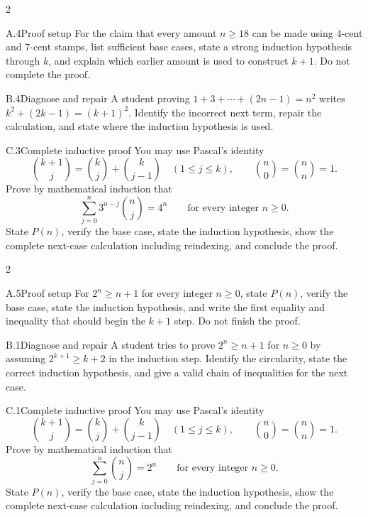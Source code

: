 \documentclass[9pt]{extarticle}
\begin{document}
\CoreWorkArea
\FormBreak
{}
\begin{multicols}{2}
\begin{CompactCoreProblem}{A.4}{Proof setup}
For the claim that every amount $n\ge18$ can be made using 4-cent and 7-cent stamps, list sufficient base cases, state a strong induction hypothesis through $k$, and explain which earlier amount is used to construct $k+1$. Do not complete the proof.
\end{CompactCoreProblem}
\begin{CompactCoreProblem}{B.4}{Diagnose and repair}
A student proving $1+3+\cdots+(2n-1)=n^2$ writes $k^2+(2k-1)=(k+1)^2$. Identify the incorrect next term, repair the calculation, and state where the induction hypothesis is used.
\end{CompactCoreProblem}
\end{multicols}
\begin{CompactCoreProblem}{C.3}{Complete inductive proof}
You may use Pascal's identity
\[
\binom{k+1}{j}=\binom{k}{j}+\binom{k}{j-1}
\quad(1\le j\le k),\qquad
\binom{n}{0}=\binom{n}{n}=1.
\]
Prove by mathematical induction that
\[
\sum_{j=0}^{n} 3^{n-j}\binom{n}{j}=4^n\qquad\text{for every integer }n\ge0.
\]
State $P(n)$, verify the base case, state the induction hypothesis, show the complete next-case calculation including reindexing, and conclude the proof.
\end{CompactCoreProblem}
\CoreWorkArea
\FormBreak
{}
\begin{multicols}{2}
\begin{CompactCoreProblem}{A.5}{Proof setup}
For $2^n\ge n+1$ for every integer $n\ge0$, state $P(n)$, verify the base case, state the induction hypothesis, and write the first equality and inequality that should begin the $k+1$ step. Do not finish the proof.
\end{CompactCoreProblem}
\begin{CompactCoreProblem}{B.1}{Diagnose and repair}
A student tries to prove $2^n\ge n+1$ for $n\ge0$ by assuming $2^{k+1}\ge k+2$ in the induction step. Identify the circularity, state the correct induction hypothesis, and give a valid chain of inequalities for the next case.
\end{CompactCoreProblem}
\end{multicols}
\begin{CompactCoreProblem}{C.1}{Complete inductive proof}
You may use Pascal's identity
\[
\binom{k+1}{j}=\binom{k}{j}+\binom{k}{j-1}
\quad(1\le j\le k),\qquad
\binom{n}{0}=\binom{n}{n}=1.
\]
Prove by mathematical induction that
\[
\sum_{j=0}^{n}\binom{n}{j}=2^n\qquad\text{for every integer }n\ge0.
\]
State $P(n)$, verify the base case, state the induction hypothesis, show the complete next-case calculation including reindexing, and conclude the proof.
\end{CompactCoreProblem}
\end{document}
